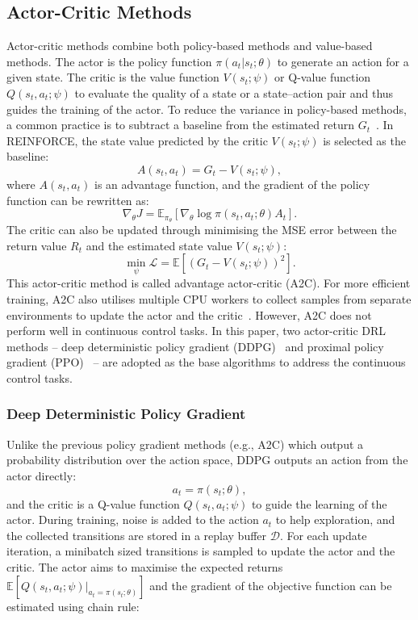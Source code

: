 \subsection{Actor-Critic Methods}
\label{ch3:actor-critic}
Actor-critic methods combine both policy-based methods and value-based methods. The actor is the policy function $\pi(a_{t}|s_{t};\theta)$ to generate an action for a given state. The critic is the value function $V(s_{t};\psi)$ or Q-value function $Q(s_{t},a_{t};\psi)$ to evaluate the quality of a state or a state--action pair and thus guides the training of the actor. To reduce the variance in policy-based methods, a common practice is to subtract a baseline from the estimated return $G_{t}$~\cite{sutton2018reinforcement}. In REINFORCE, the state value predicted by the critic $V(s_{t};\psi)$ is selected as the baseline:
\begin{equation}
    A(s_{t}, a_{t}) = G_{t} - V(s_{t};\psi),
\end{equation}
where $A(s_{t}, a_{t})$ is an advantage function, and the gradient of the policy function can be rewritten as:
\begin{equation}
    \nabla_{\theta} J = \mathbb{E}_{\pi_{\theta}}[\nabla_{\theta}\log\pi(s_{t},a_{t};\theta)A_{t}].
\end{equation}
The critic can also be updated through minimising the MSE error between the return value $R_{t}$ and the estimated state value $V(s_{t};\psi)$:
\begin{equation}
    \min_{\psi}\mathcal{L} = \mathbb{E}[(G_{t} - V(s_{t};\psi))^2].
    \label{eq:mse}
\end{equation}
This actor-critic method is called advantage actor-critic (A2C). For more efficient training, A2C also utilises multiple CPU workers to collect samples from separate environments to update the actor and the critic~\cite{mnih2016asynchronous}. However, A2C does not perform well in continuous control tasks. In this paper, two actor-critic DRL methods -- deep deterministic policy gradient (DDPG)~\cite{lillicrap2015continuous} and proximal policy gradient (PPO)~\cite{schulman2017proximal} -- are adopted as the base algorithms to address the continuous control tasks.

\subsubsection{Deep Deterministic Policy Gradient}
Unlike the previous policy gradient methods (e.g., A2C) which output a probability distribution over the action space, DDPG outputs an action from the actor directly:
\begin{equation}
    a_{t} = \pi(s_{t}; \theta),
\end{equation}
and the critic is a Q-value function $Q(s_{t}, a_{t};\psi)$ to guide the learning of the actor. During training, noise is added to the action $a_{t}$ to help exploration, and the collected transitions are stored in a replay buffer $\mathcal{D}$. For each update iteration, a minibatch sized transitions is sampled to update the actor and the critic. The actor aims to maximise the expected returns $\mathbb{E}[Q(s_{t}, a_{t};\psi)|_{a_{t}=\pi(s_{t};\theta)}]$ and the gradient of the objective function can be estimated using chain rule:

